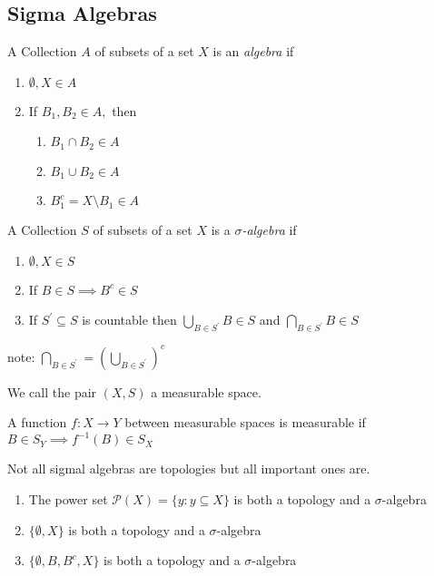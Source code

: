 \subsection{Sigma Algebras}

\begin{definition}[Algebra]
	A Collection $A$ of subsets of a set $X$ is an \emph{algebra} if 
	\begin{enumerate}
		\item $\emptyset, X \in A$
		\item If $B_1, B_2 \in A,$ then
			\begin{enumerate}
				\item $B_1 \cap B_2 \in A$
				\item  $B_1 \cup B_2 \in A$
				\item  $B_1^{c} = X \setminus B_1 \in A$
			\end{enumerate}
	\end{enumerate}
\end{definition}

\begin{definition}
	A Collection $S$ of subsets of a set $X$ is a \emph{$\sigma$-algebra} if 
	\begin{enumerate}
		\item $\emptyset, X \in S$
		\item If $B\in S \implies B^{c} \in S$
		\item If $S^{'} \subseteq S$ is countable then 
			$\bigcup\limits_{B \in S^{'}} B \in S$ and $\bigcap\limits_{B \in S^{'}} B \in S$
	\end{enumerate}
note: $\bigcap\limits_{B \in S^{'}} = (\bigcup\limits_{B \in S^{'}} )^{c}$

We call the pair $(X, S)$ a measurable space.
\end{definition}

\begin{definition}
	A function $f : X \to Y$ between measurable spaces is measurable if $B \in S_Y \implies f^{-1}(B) \in S_X$
\end{definition}

\begin{claim*}
	Not all sigmal algebras are topologies but all important ones are.
\end{claim*}

\begin{example}
	\begin{enumerate}
		\item The power set $\mathcal{P} (X) = \{y : y \subseteq X\}$ is both a topology and a $\sigma$-algebra
		\item $\{\emptyset, X\}$ is both a topology and a $\sigma$-algebra
		\item $\{\emptyset, B, B^{c}, X\}$ is both a topology and a $\sigma$-algebra
	\end{enumerate}
\end{example}

